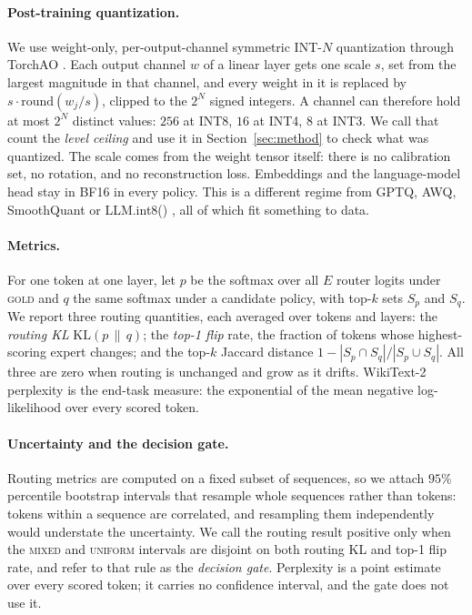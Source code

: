 \documentclass[11pt]{article}
\newcommand{\gold}{\textsc{gold}}
\newcommand{\uniform}{\textsc{uniform}}
\newcommand{\mixed}{\textsc{mixed}}
\begin{document}
\paragraph{Post-training quantization.}
We use weight-only, per-output-channel symmetric INT-$N$ quantization
through TorchAO \citep{or2025torchao}. Each output channel $w$ of a linear
layer gets one scale $s$, set from the largest magnitude in that channel,
and every weight in it is replaced by $s\cdot\mathrm{round}(w_j/s)$,
clipped to the $2^{N}$ signed integers. A channel can therefore hold at
most $2^{N}$ distinct values: $256$ at INT8, $16$ at INT4, $8$ at INT3. We
call that count the \emph{level ceiling} and use it in
Section~\ref{sec:method} to check what was quantized. The scale comes from
the weight tensor itself: there is no calibration set, no rotation, and no
reconstruction loss. Embeddings and the language-model head stay in BF16 in
every policy. This is a different regime from GPTQ, AWQ, SmoothQuant or
LLM.int8()
\citep{frantar2023gptq,lin2024awq,xiao2023smoothquant,dettmers2022llmint8},
all of which fit something to data.

\paragraph{Metrics.}
For one token at one layer, let $p$ be the softmax over all $E$ router
logits under \gold{} and $q$ the same softmax under a candidate policy,
with top-$k$ sets $S_p$ and $S_q$. We report three routing quantities,
each averaged over tokens and layers: the \emph{routing KL}
$\mathrm{KL}(p\,\|\,q)$; the \emph{top-1 flip} rate, the fraction of
tokens whose highest-scoring expert changes; and the top-$k$ Jaccard
distance $1-|S_p\cap S_q|/|S_p\cup S_q|$. All three are zero when routing
is unchanged and grow as it drifts. WikiText-2 perplexity
\citep{merity2017pointer} is the end-task measure: the exponential of the
mean negative log-likelihood over every scored token.

\paragraph{Uncertainty and the decision gate.}
Routing metrics are computed on a fixed subset of sequences, so we attach
$95\%$ percentile bootstrap intervals that resample whole sequences rather
than tokens: tokens within a sequence are correlated, and resampling them
independently would understate the uncertainty. We call the routing
result positive only when the \mixed{} and \uniform{} intervals are
disjoint on both routing KL and top-1 flip rate, and refer to that rule as
the \emph{decision gate}. Perplexity is a point estimate over every scored
token; it carries no confidence interval, and the gate does not use it.
\end{document}
